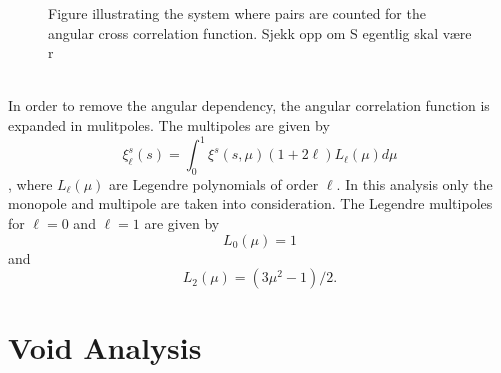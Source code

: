 \begin{figure}\label{fig:corrpair}
    \caption{Figure illustrating the system where pairs are counted for the angular cross correlation function. Sjekk opp om S egentlig skal være r}
\end{figure}
\\\indent
In order to remove the angular dependency, the angular correlation function is
expanded in mulitpoles. The multipoles are given by 
\begin{equation}
    \xi^s_\ell(s)=\int_0^1\xi^s(s,\mu)(1+2\ell)L_\ell(\mu)d\mu
\end{equation}
\cite{Nadathur_corr}, where $L_\ell(\mu)$ are Legendre polynomials
of order $\ell$. In this analysis only the monopole and multipole
are taken into consideration. The Legendre multipoles for $\ell=0$ and
$\ell=1$ are given by
\begin{equation}
    L_0(\mu)=1
\end{equation}
and
\begin{equation}
    L_2(\mu)=(3\mu^2-1)/2.
\end{equation}
\section{Void Analysis}
